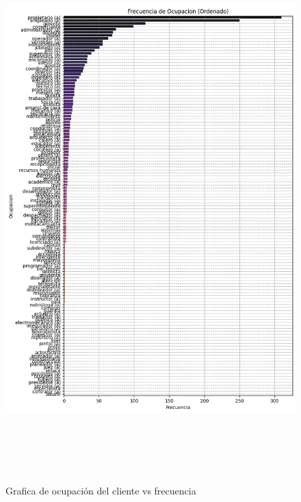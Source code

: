 \begin{figure}[H]
    \centering
       \includegraphics[width=14cm, height=21cm ]{Imagenes/Ocupacion.png}
      \caption{Grafica de ocupación del cliente vs frecuencia}
      \label{fig:Ocupacion}
\end{figure}

